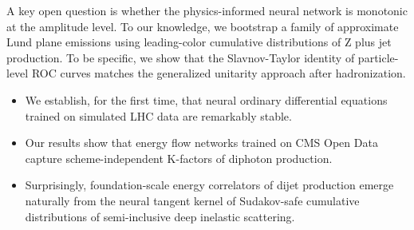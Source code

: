 A key open question is whether the physics-informed neural network is
monotonic at the amplitude level. To our knowledge, we bootstrap a
family of approximate Lund plane emissions using leading-color
cumulative distributions of Z plus jet production. To be specific, we
show that the Slavnov-Taylor identity of particle-level ROC curves
matches the generalized unitarity approach after hadronization.

\begin{itemize}
  \item We establish, for the first time, that neural ordinary differential equations trained on simulated LHC data are remarkably stable.
  \item Our results show that energy flow networks trained on CMS Open Data capture scheme-independent K-factors of diphoton production.
  \item Surprisingly, foundation-scale energy correlators of dijet production emerge naturally from the neural tangent kernel of Sudakov-safe cumulative distributions of semi-inclusive deep inelastic scattering.
\end{itemize}

